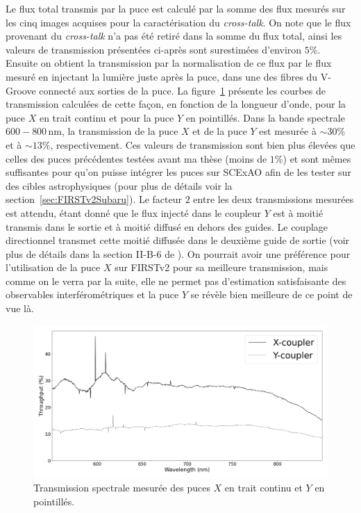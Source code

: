 \label{sec:IOChipThroughput}

Le flux total transmis par la puce est calculé par la somme des flux mesurés sur les cinq images acquises pour la caractérisation du \textit{cross-talk}. On note que le flux provenant du \textit{cross-talk} n'a pas été retiré dans la somme du flux total, ainsi les valeurs de transmission présentées ci-après sont surestimées d'environ $5\%$. Ensuite on obtient la transmission par la normalisation de ce flux par le flux mesuré en injectant la lumière juste après la puce, dans une des fibres du V-Groove connecté aux sorties de la puce. La figure~\ref{fig:ChipThroughput} présente les courbes de transmission calculées de cette façon, en fonction de la longueur d'onde, pour la puce $X$ en trait continu et pour la puce $Y$ en pointillés. Dans la bande spectrale $600 - 800 \,$nm, la transmission de la puce $X$ et de la puce $Y$ est mesurée à $\sim 30\%$ et à $\sim 13\%$, respectivement. Ces valeurs de transmission sont bien plus élevées que celles des puces précédentes testées avant ma thèse (moins de $1\%$) et sont mêmes suffisantes pour qu'on puisse intégrer les puces sur \ac{SCExAO} afin de les tester sur des cibles astrophysiques (pour plus de détails voir la section~\ref{sec:FIRSTv2Subaru}). Le facteur $2$ entre les deux transmissions mesurées est attendu, étant donné que le flux injecté dans le coupleur $Y$ est à moitié transmis dans le sortie et à moitié diffusé en dehors des guides. Le couplage directionnel transmet cette moitié diffusée dans le deuxième guide de sortie (voir plus de détails dans la section II-B-6 de \cite{labeye2008}). On pourrait avoir une préférence pour l'utilisation de la puce $X$ sur \ac{FIRSTv2} pour sa meilleure transmission, mais comme on le verra par la suite, elle ne permet pas d'estimation satisfaisante des observables interférométriques et la puce $Y$ se révèle bien meilleure de ce point de vue là.

\begin{figure}[ht!]
    \centering
    \includegraphics[width=\figwidth]{Figure_Chap2/ThroughputComparison_20201124_20201119_LaTex.png}
    \caption[Transmission spectrale mesurée des puces $X$ et $Y$.]{Transmission spectrale mesurée des puces $X$ en trait continu et $Y$ en pointillés.}
    \label{fig:ChipThroughput}
\end{figure}


